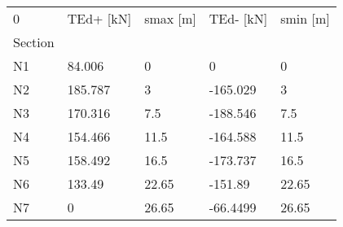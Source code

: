 \begin{tabular}{lllll}
\toprule
0 & TEd+ [kN] & smax [m] & TEd- [kN] & smin [m] \\
Section &           &          &           &          \\
\midrule
N1      &    84.006 &        0 &         0 &        0 \\
N2      &   185.787 &        3 &  -165.029 &        3 \\
N3      &   170.316 &      7.5 &  -188.546 &      7.5 \\
N4      &   154.466 &     11.5 &  -164.588 &     11.5 \\
N5      &   158.492 &     16.5 &  -173.737 &     16.5 \\
N6      &    133.49 &    22.65 &   -151.89 &    22.65 \\
N7      &         0 &    26.65 &  -66.4499 &    26.65 \\
\bottomrule
\end{tabular}
